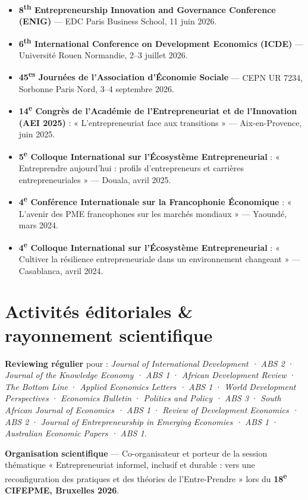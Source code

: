 \documentclass[
  french,
  10pt,
  letterpaper,
  DIV=11,
  numbers=noendperiod]{scrartcl}
\begin{document}
\begin{itemize}[itemsep=2pt]
\item \textbf{8\textsuperscript{th} Entrepreneurship Innovation and Governance Conference (ENIG)} — EDC Paris Business School, 11 juin 2026.
\item \textbf{6\textsuperscript{th} International Conference on Development Economics (ICDE)} — Université Rouen Normandie, 2–3 juillet 2026.
\item \textbf{45\textsuperscript{es} Journées de l'Association d'Économie Sociale} — CEPN UR 7234, Sorbonne Paris Nord, 3–4 septembre 2026.
\item \textbf{14\textsuperscript{e} Congrès de l'Académie de l'Entrepreneuriat et de l'Innovation (AEI 2025)} : « L'entrepreneuriat face aux transitions » — Aix-en-Provence, juin 2025.
\item \textbf{5\textsuperscript{e} Colloque International sur l'Écosystème Entrepreneurial} : « Entreprendre aujourd'hui : profils d'entrepreneurs et carrières entrepreneuriales » — Douala, avril 2025.
\item \textbf{4\textsuperscript{e} Conférence Internationale sur la Francophonie Économique} : « L'avenir des PME francophones sur les marchés mondiaux » — Yaoundé, mars 2024.
\item \textbf{4\textsuperscript{e} Colloque International sur l'Écosystème Entrepreneurial} : « Cultiver la résilience entrepreneuriale dans un environnement changeant » — Casablanca, avril 2024.
\end{itemize}

\section{Activités éditoriales \& rayonnement
scientifique}\label{activituxe9s-uxe9ditoriales-rayonnement-scientifique}

\textbf{Reviewing régulier} pour :
\textit{Journal of International Development · ABS 2} ·
\textit{Journal of the Knowledge Economy · ABS 1} ·
\textit{African Development Review} · \textit{The Bottom Line} ·
\textit{Applied Economics Letters · ABS 1} ·
\textit{World Development Perspectives} · \textit{Economics Bulletin} ·
\textit{Politics and Policy · ABS 3} ·
\textit{South African Journal of Economics · ABS 1} ·
\textit{Review of Development Economics · ABS 2} ·
\textit{Journal of Entrepreneurship in Emerging Economies · ABS 1} ·
\textit{ Australian Economic Papers · ABS 1}.

\textbf{Organisation scientifique} --- Co-organisateur et porteur de la
session thématique « Entrepreneuriat informel, inclusif et durable :
vers une reconfiguration des pratiques et des théories de
l'Entre-Prendre » lors du
\textbf{18\textsuperscript{e} CIFEPME, Bruxelles 2026}.
\end{document}
